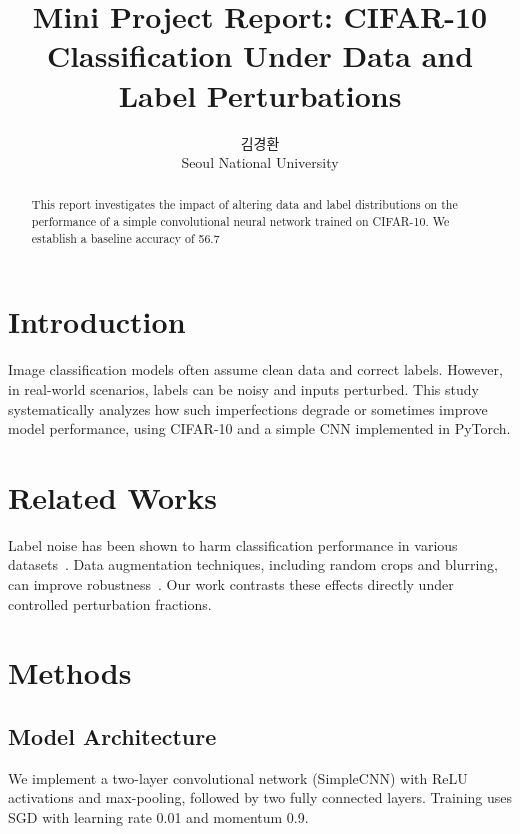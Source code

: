 \documentclass[10pt,twocolumn,letterpaper]{article}
\begin{document}
\title{Mini Project Report: CIFAR-10 Classification Under Data and Label Perturbations}
\author{김경환\\ Seoul National University}
\maketitle
\thispagestyle{empty}

\begin{abstract}
This report investigates the impact of altering data and label distributions on the performance of a simple convolutional neural network trained on CIFAR-10. We establish a baseline accuracy of 56.7%
\end{abstract}

\section{Introduction}
Image classification models often assume clean data and correct labels. However, in real-world scenarios, labels can be noisy and inputs perturbed. This study systematically analyzes how such imperfections degrade or sometimes improve model performance, using CIFAR-10 and a simple CNN implemented in PyTorch.

\section{Related Works}
Label noise has been shown to harm classification performance in various datasets~\cite{frenay2013classification,rolnick2017deep}. Data augmentation techniques, including random crops and blurring, can improve robustness~\cite{shorten2019survey}. Our work contrasts these effects directly under controlled perturbation fractions.

\section{Methods}
\subsection{Model Architecture}
We implement a two-layer convolutional network (SimpleCNN) with ReLU activations and max-pooling, followed by two fully connected layers. Training uses SGD with learning rate 0.01 and momentum 0.9.
\end{document}
